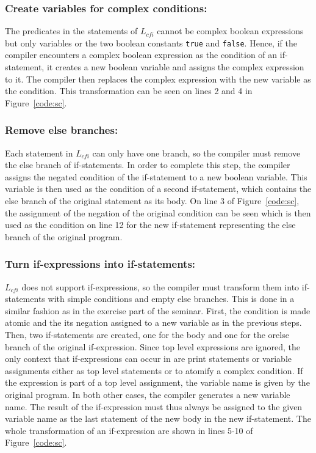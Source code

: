 \subsubsection{Create variables for complex conditions:}
The predicates in the statements of $L_{cfi}$ cannot be complex boolean expressions but only variables or the two boolean constants \texttt{true} and \texttt{false}.
Hence, if the compiler encounters a complex boolean expression as the condition of an if-statement, it creates a new boolean variable and assigns the complex expression to it. 
The compiler then replaces the complex expression with the new variable as the condition.
This transformation can be seen on lines 2 and 4 in Figure~\ref{code:sc}.

\subsubsection{Remove else branches:}
Each statement in $L_{cfi}$ can only have one branch, so the compiler must remove the else branch of if-statements.
In order to complete this step, the compiler assigns the negated condition of the if-statement to a new boolean variable.
This variable is then used as the condition of a second if-statement, which contains the else branch of the original statement as its body.
On line 3 of Figure~\ref{code:sc}, the assignment of the negation of the original condition can be seen which is then used as the condition on line 12 for the new if-statement representing the else branch of the original program.

\subsubsection{Turn if-expressions into if-statements:}
$L_{cfi}$ does not support if-expressions, so the compiler must transform them into if-statements with simple conditions and empty else branches. This is done in a similar fashion as in the exercise part of the seminar.
First, the condition is made atomic and the its negation assigned to a new variable as in the previous steps.
Then, two if-statements are created, one for the body and one for the orelse branch of the original if-expression.
Since top level expressions are ignored, the only context that if-expressions can occur in are print statements or variable assignments either as top level statements or to atomify a complex condition.
If the expression is part of a top level assignment, the variable name is given by the original program. In both other cases, the compiler generates a new variable name.
The result of the if-expression must thus always be assigned to the given variable name as the last statement of the new body in the new if-statement.
The whole transformation of an if-expression are shown in lines 5-10 of Figure~\ref{code:sc}.

